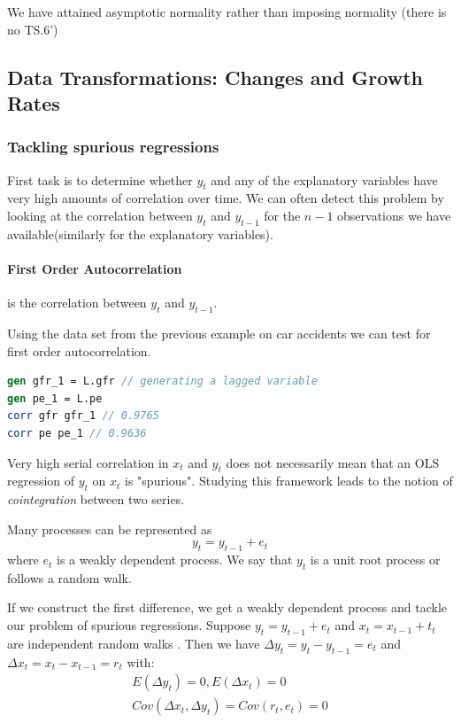 \documentclass[11pt]{article}
\begin{document}
We have attained asymptotic normality rather than imposing normality (there is no TS.6')

\subsection{Data Transformations: Changes and Growth Rates}

\subsubsection{Tackling spurious regressions}

First task is to determine whether $y_t$ and any of the explanatory variables have very high amounts of correlation over time. We can often detect this problem by looking at the correlation between $y_t$ and $y_{t-1}$ for the $n-1$ observations we have available(similarly for the explanatory variables).

\paragraph{First Order Autocorrelation} is the correlation between $y_t$ and $y_{t-1}$. 

Using the data set from the previous example on car accidents we can test for first order autocorrelation.

\begin{lstlisting}[language = Stata, caption = Finding first order Autocorrelation in Fertility Data, numbers = none]
gen gfr_1 = L.gfr // generating a lagged variable
gen pe_1 = L.pe
corr gfr gfr_1 // 0.9765
corr pe pe_1 // 0.9636
\end{lstlisting}

Very high serial correlation in $x_t$ and $y_t$ does not necessarily mean that an OLS regression of $y_t$ on $x_t$ is "spurious". Studying this framework leads to the notion of \textit{cointegration} between two series.


Many processes can be represented as 
\[y_t = y_{t-1} + e_t\]
where $e_t$ is a weakly dependent process. We say that $y_t$ is a unit root process or follows a random walk.

If we construct the first difference, we get a weakly dependent process and tackle our problem of spurious regressions. Suppose $y_t = y_{t-1} + e_t$ and $x_t = x_{t-1} + t_t$ are independent random walks . Then we have $\Delta y_t = y_t - y_{t-1} = e_t$ and $\Delta x_t = x_t - x_{t-1} = r_t$ with:
\begin{gather*}
    E(\Delta y_t) = 0, E(\Delta x_t) = 0 \\
    Cov(\Delta x_t, \Delta y_t) = Cov(r_t, e_t) = 0
\end{gather*}
\end{document}
